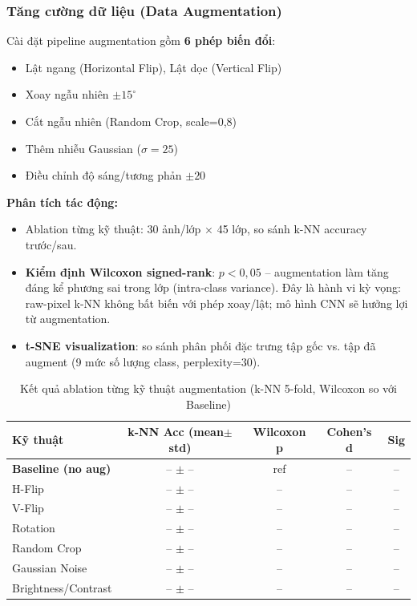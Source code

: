 \documentclass[12pt,a4paper]{article}
\let\oldtextbf\textbf
\renewcommand{\textbf}[1]{\oldtextbf{\textcolor{hcmublue}{#1}}}
\begin{document}
\subsubsection{Tăng cường dữ liệu (Data Augmentation)}

Cài đặt pipeline augmentation gồm \textbf{6 phép biến đổi}:
\begin{itemize}
    \item Lật ngang (Horizontal Flip), Lật dọc (Vertical Flip)
    \item Xoay ngẫu nhiên $\pm 15^{\circ}$
    \item Cắt ngẫu nhiên (Random Crop, scale=0,8)
    \item Thêm nhiễu Gaussian ($\sigma = 25$)
    \item Điều chỉnh độ sáng/tương phản $\pm 20$
\end{itemize}

\textbf{Phân tích tác động:}
\begin{itemize}
    \item Ablation từng kỹ thuật: 30 ảnh/lớp $\times$ 45 lớp, so sánh k-NN accuracy trước/sau. 
    \item \textbf{Kiểm định Wilcoxon signed-rank}: $p < 0{,}05$ -- augmentation làm tăng đáng kể phương sai trong lớp (intra-class variance). Đây là hành vi kỳ vọng: raw-pixel k-NN không bất biến với phép xoay/lật; mô hình CNN sẽ hưởng lợi từ augmentation.
    \item \textbf{t-SNE visualization}: so sánh phân phối đặc trưng tập gốc vs. tập đã augment (9 mức số lượng class, perplexity=30).
\end{itemize}

\begin{table}[H]
\centering
\begin{tabular}{|l|c|c|c|c|}
\hline
\textbf{Kỹ thuật} & \textbf{k-NN Acc (mean$\pm$std)} & \textbf{Wilcoxon p} & \textbf{Cohen's d} & \textbf{Sig} \\ \hline
\textbf{Baseline (no aug)} & -- $\pm$ -- & ref & -- & -- \\ \hline
H-Flip              & -- $\pm$ -- & -- & -- & -- \\ \hline
V-Flip              & -- $\pm$ -- & -- & -- & -- \\ \hline
Rotation            & -- $\pm$ -- & -- & -- & -- \\ \hline
Random Crop         & -- $\pm$ -- & -- & -- & -- \\ \hline
Gaussian Noise      & -- $\pm$ -- & -- & -- & -- \\ \hline
Brightness/Contrast & -- $\pm$ -- & -- & -- & -- \\ \hline
\end{tabular}
\caption{Kết quả ablation từng kỹ thuật augmentation (k-NN 5-fold, Wilcoxon so với Baseline)}
\label{tab:aug_ablation}
\end{table}
\end{document}
